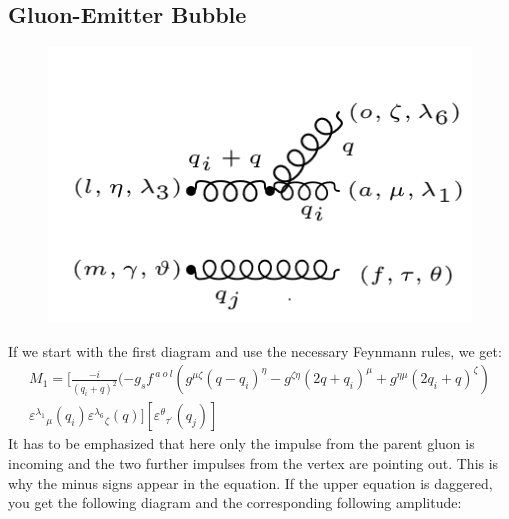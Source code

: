 \subsection{Gluon-Emitter Bubble}
\begin{figure}[ht!]
\centering
\includegraphics[scale=0.7]{images/GG/M1gg.png}
\end{figure}
If we start with the first diagram and use the necessary Feynmann rules, we get:
\begin{equation}
\begin{split}
M_1=[\frac{-i}{(q_i +q)^2}(-g_s f^{\:a\:o\:l}(g^{{\mu}{\zeta}}(q-q_i)^{\eta}-g^{{\zeta}{\eta}}(2q +q_i)^{\mu}+g^{{\eta}{\mu}}(2q_i +q)^{\zeta})\\
{\varepsilon^{\lambda_1}}_{\mu} (q_i) {\varepsilon^{\lambda_6}}_{\zeta} (q)][{{\varepsilon^{\theta}}_{{\tau}^{\prime}}} (q_j)]
\end{split}
\end{equation}
It has to be emphasized that here only the impulse from the parent gluon is incoming and the two further impulses from the vertex are pointing out. This is why the minus signs appear in the equation.
If the upper equation is daggered, you get the following diagram and the corresponding following amplitude:

